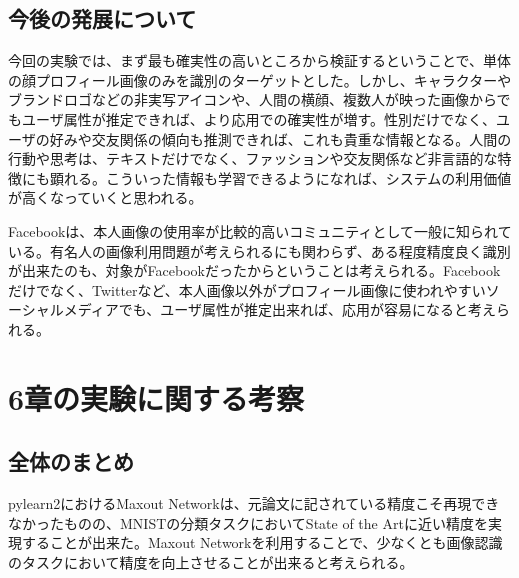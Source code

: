 \subsection{今後の発展について}
今回の実験では、まず最も確実性の高いところから検証するということで、単体の顔プロフィール画像のみを識別のターゲットとした。しかし、キャラクターやブランドロゴなどの非実写アイコンや、人間の横顔、複数人が映った画像からでもユーザ属性が推定できれば、より応用での確実性が増す。性別だけでなく、ユーザの好みや交友関係の傾向も推測できれば、これも貴重な情報となる。人間の行動や思考は、テキストだけでなく、ファッションや交友関係など非言語的な特徴にも顕れる。こういった情報も学習できるようになれば、システムの利用価値が高くなっていくと思われる。\par
Facebookは、本人画像の使用率が比較的高いコミュニティとして一般に知られている。有名人の画像利用問題が考えられるにも関わらず、ある程度精度良く識別が出来たのも、対象がFacebookだったからということは考えられる。Facebookだけでなく、Twitterなど、本人画像以外がプロフィール画像に使われやすいソーシャルメディアでも、ユーザ属性が推定出来れば、応用が容易になると考えられる。

\section{6章の実験に関する考察}
\subsection{全体のまとめ}
pylearn2におけるMaxout Networkは、元論文に記されている精度こそ再現できなかったものの、MNISTの分類タスクにおいてState of the Artに近い精度を実現することが出来た。Maxout Networkを利用することで、少なくとも画像認識のタスクにおいて精度を向上させることが出来ると考えられる。\par
